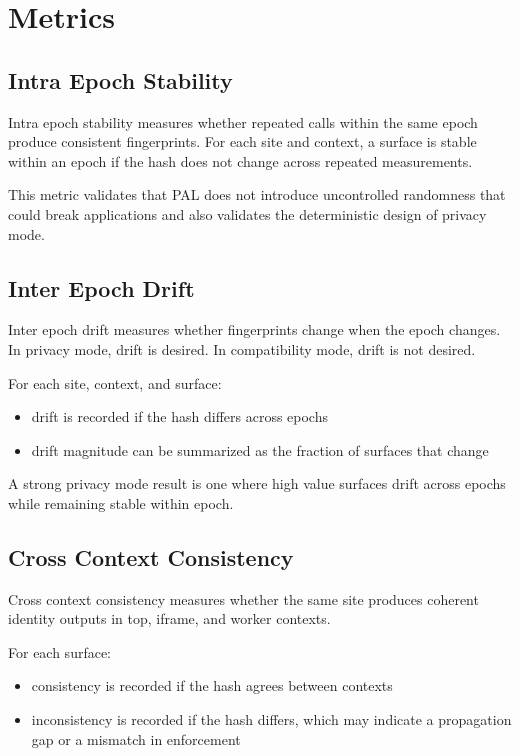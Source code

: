 \documentclass[11pt]{report}
\begin{document}
\section{Metrics}

\subsection{Intra Epoch Stability}

Intra epoch stability measures whether repeated calls within the same epoch produce consistent fingerprints. For each site and context, a surface is stable within an epoch if the hash does not change across repeated measurements.

This metric validates that PAL does not introduce uncontrolled randomness that could break applications and also validates the deterministic design of privacy mode.

\subsection{Inter Epoch Drift}

Inter epoch drift measures whether fingerprints change when the epoch changes. In privacy mode, drift is desired. In compatibility mode, drift is not desired.

For each site, context, and surface:

\begin{itemize}
    \item drift is recorded if the hash differs across epochs
    \item drift magnitude can be summarized as the fraction of surfaces that change
\end{itemize}

A strong privacy mode result is one where high value surfaces drift across epochs while remaining stable within epoch.

\subsection{Cross Context Consistency}

Cross context consistency measures whether the same site produces coherent identity outputs in top, iframe, and worker contexts.

For each surface:

\begin{itemize}
    \item consistency is recorded if the hash agrees between contexts
    \item inconsistency is recorded if the hash differs, which may indicate a propagation gap or a mismatch in enforcement
\end{itemize}
\end{document}
